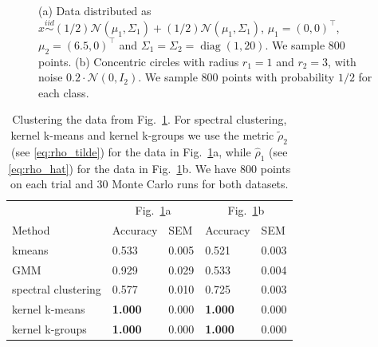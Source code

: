 \documentclass[10pt,journal,compsoc]{IEEEtran}
\DeclareMathOperator{\diag}{diag}
\begin{document}
\begin{figure}
\begin{minipage}{0.2\textwidth}
\end{minipage}
\caption{
\label{fig:2dscatter}
(a) Data distributed as 
$x \stackrel{iid}{\sim}
(1/2)\mathcal{N}(\mu_1,\Sigma_1)+
(1/2)\mathcal{N}(\mu_1,\Sigma_1)$, 
$\mu_1= (0,0)^\top$, 
$\mu_2 = (6.5, 0)^\top$ and 
$\Sigma_1 = \Sigma_2 = \diag(1, 20)$. We sample $800$ points.
(b) Concentric circles with radius $r_1 = 1$ and $r_2 = 3$, with 
noise $0.2 \cdot \mathcal{N}(0, I_2)$. We sample 
800 points with probability $1/2$ for each class.
} 
\end{figure}

\begin{table}[t]
\caption{
\label{tb:cigar_circle}
Clustering the data from Fig.~\ref{fig:2dscatter}.
For spectral clustering, kernel k-means and kernel k-groups we use
the metric $\widetilde{\rho}_2$ (see \eqref{eq:rho_tilde}) for the data
in Fig.~\ref{fig:2dscatter}a, while $\widehat{\rho}_1$ (see \eqref{eq:rho_hat})
for the data in Fig.~\ref{fig:2dscatter}b. We have 800
points on each trial and 30 Monte Carlo runs for both datasets.
}
\centering
\begin{tabular}{@{}l|ll|ll@{}}
                   & \multicolumn{2}{c|}{Fig.~\ref{fig:2dscatter}a}  &
                     \multicolumn{2}{c}{Fig.~\ref{fig:2dscatter}b}  \\
       Method      & Accuracy & SEM     & Accuracy & SEM \\ \midrule[.5pt]
        kmeans       & 0.533 & 0.005  & 0.521   & 0.003 \\
         GMM         & 0.929 & 0.029  & 0.533   & 0.004 \\
 spectral clustering & 0.577 & 0.010  & 0.725   & 0.003 \\
    kernel k-means   & \textbf{1.000} & 0.000  & \textbf{1.000}   & 0.000 \\
   kernel k-groups   & \textbf{1.000} & 0.000  & \textbf{1.000}  & 0.000  
\end{tabular}
\end{table}
\end{document}

